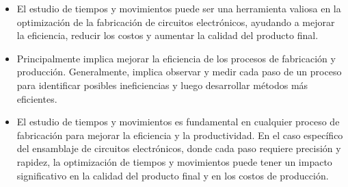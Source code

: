     \begin{itemize}
        \item El estudio de tiempos y movimientos puede ser una herramienta valiosa en la optimización de la fabricación de circuitos electrónicos, ayudando a mejorar la eficiencia, reducir los costos y aumentar la calidad del producto final.
        
        \item Principalmente implica mejorar la eficiencia de los procesos de fabricación y producción. Generalmente, implica observar y medir cada paso de un proceso para identificar posibles ineficiencias y luego desarrollar métodos más eficientes.
        \item El estudio de tiempos y movimientos es fundamental en cualquier proceso de fabricación para mejorar la eficiencia y la productividad. En el caso específico del ensamblaje de circuitos electrónicos, donde cada paso requiere precisión y rapidez, la optimización de tiempos y movimientos puede tener un impacto significativo en la calidad del producto final y en los costos de producción.
    \end{itemize}
